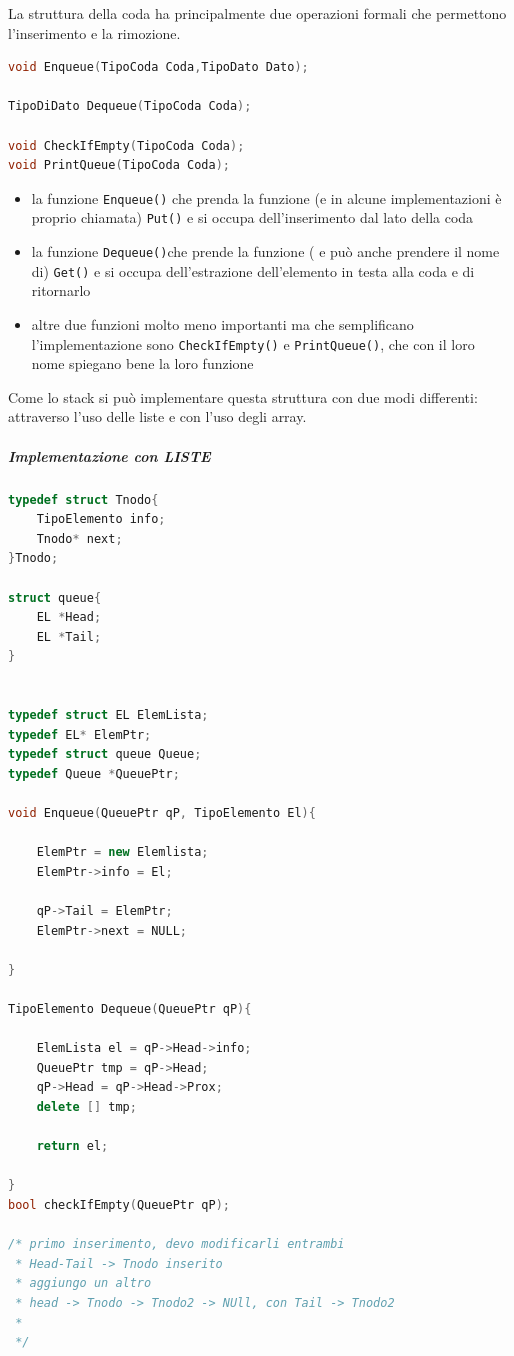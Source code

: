 \documentclass[
  paper=a4,
  oneside  ,captions=tableheading
]{scrbook}
\newcommand{\passthrough}[1]{#1}
\providecommand{\tightlist}{%
  \setlength{\itemsep}{0pt}\setlength{\parskip}{0pt}}
\begin{document}
La struttura della coda ha principalmente due operazioni formali che
permettono l'inserimento e la rimozione.

\begin{lstlisting}[language=C]
void Enqueue(TipoCoda Coda,TipoDato Dato); 

TipoDiDato Dequeue(TipoCoda Coda);

void CheckIfEmpty(TipoCoda Coda);
void PrintQueue(TipoCoda Coda);
\end{lstlisting}

\begin{itemize}
\tightlist
\item
  la funzione \passthrough{\lstinline!Enqueue()!} che prenda la funzione
  (e in alcune implementazioni è proprio chiamata)
  \passthrough{\lstinline!Put()!} e si occupa dell'inserimento dal lato
  della coda
\item
  la funzione \passthrough{\lstinline!Dequeue()!}che prende la funzione
  ( e può anche prendere il nome di) \passthrough{\lstinline!Get()!} e
  si occupa dell'estrazione dell'elemento in testa alla coda e di
  ritornarlo
\item
  altre due funzioni molto meno importanti ma che semplificano
  l'implementazione sono \passthrough{\lstinline!CheckIfEmpty()!} e
  \passthrough{\lstinline!PrintQueue()!}, che con il loro nome spiegano
  bene la loro funzione
\end{itemize}

Come lo stack si può implementare questa struttura con due modi
differenti: attraverso l'uso delle liste e con l'uso degli array.

\hypertarget{implementazione-con-liste}{%
\subparagraph{\texorpdfstring{Implementazione con
\emph{LISTE}}{Implementazione con LISTE}}\label{implementazione-con-liste}}

\begin{lstlisting}[language={C++}]
typedef struct Tnodo{
    TipoElemento info;
    Tnodo* next;
}Tnodo;

struct queue{
    EL *Head;
    EL *Tail;
}


typedef struct EL ElemLista;
typedef EL* ElemPtr;
typedef struct queue Queue;
typedef Queue *QueuePtr;

void Enqueue(QueuePtr qP, TipoElemento El){
    
    ElemPtr = new Elemlista;
    ElemPtr->info = El;
    
    qP->Tail = ElemPtr;
    ElemPtr->next = NULL;
    
}

TipoElemento Dequeue(QueuePtr qP){
    
    ElemLista el = qP->Head->info;
    QueuePtr tmp = qP->Head;
    qP->Head = qP->Head->Prox;
    delete [] tmp;
    
    return el;    
    
}
bool checkIfEmpty(QueuePtr qP);

/* primo inserimento, devo modificarli entrambi
 * Head-Tail -> Tnodo inserito
 * aggiungo un altro
 * head -> Tnodo -> Tnodo2 -> NUll, con Tail -> Tnodo2
 * 
 */
\end{lstlisting}
\end{document}
